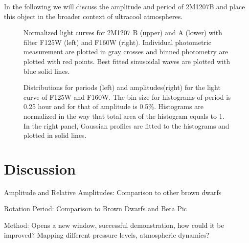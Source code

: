 \documentclass[apj]{emulateapj}
\begin{document}
In the following we will discuss the amplitude and period of 2M1207B and place this object in the broader context of ultracool atmospheres.



\begin{figure}
  \centering
  \caption{Normalized light curves for 2M1207 B (upper) and A (lower)
    with filter F125W (left) and F160W (right). Individual photometric
  measurement are plotted in gray crosses and binned photometry are
  plotted with red points. Best fitted sinusoidal waves are plotted
  with blue solid lines.}
  \label{fig:3}
\end{figure}




\begin{figure}
  \centering
  \caption{Distributions for periods (left) and amplitudes(right) for the light
    curve of F125W and F160W. The bin size for histograms of period is
  0.25 hour and for that of amplitude is 0.5\%. Histograms are
  normalized in the way that total area of the histogram equals to
  1. In the right panel, Gaussian profiles are fitted to the
  histograms and plotted in solid lines.}
  \label{fig:4}
\end{figure}

\section{Discussion}
Amplitude and Relative Amplitudes: Comparison to other brown dwarfs

Rotation Period: Comparison to Brown Dwarfs and Beta Pic

Method: Opens a new window, successful demonstration, how could it be improved?
Mapping different pressure levels, atmospheric dynamics?
\end{document}
